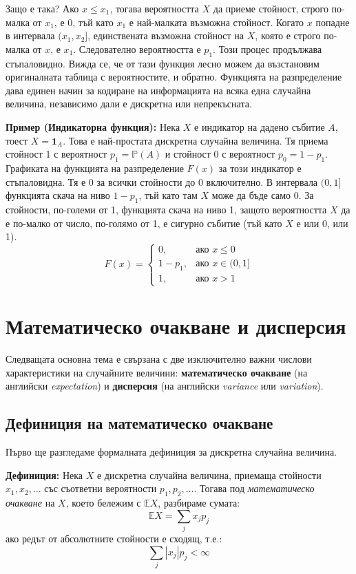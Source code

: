 \documentclass{article}
\begin{document}
Защо е така? Ако $x \le x_1$, тогава вероятността $X$ да приеме стойност, строго по-малка от $x_1$, е 0, тъй като $x_1$ е най-малката възможна стойност. Когато $x$ попадне в интервала $(x_1, x_2]$, единствената възможна стойност на $X$, която е строго по-малка от $x$, е $x_1$. Следователно вероятността е $p_1$. Този процес продължава стъпаловидно. Вижда се, че от тази функция лесно можем да възстановим оригиналната таблица с вероятностите, и обратно. Функцията на разпределение дава единен начин за кодиране на информацията на всяка една случайна величина, независимо дали е дискретна или непрекъсната.

\textbf{Пример (Индикаторна функция):}
Нека $X$ е индикатор на дадено събитие $A$, тоест $X = \mathbf{1}_A$. Това е най-простата дискретна случайна величина. Тя приема стойност 1 с вероятност $p_1 = \mathbb{P}(A)$ и стойност 0 с вероятност $p_0 = 1 - p_1$.
Графиката на функцията на разпределение $F(x)$ за този индикатор е стъпаловидна. Тя е 0 за всички стойности до 0 включително. В интервала $(0, 1]$ функцията скача на ниво $1 - p_1$, тъй като там $X$ може да бъде само 0. За стойности, по-големи от 1, функцията скача на ниво 1, защото вероятността $X$ да е по-малко от число, по-голямо от 1, е сигурно събитие (тъй като $X$ е или 0, или 1).
\[
F(x) =
\begin{cases}
0, & \text{ако } x \le 0 \\
1 - p_1, & \text{ако } x \in (0, 1] \\
1, & \text{ако } x > 1
\end{cases}
\]

\section{Математическо очакване и дисперсия}

Следващата основна тема е свързана с две изключително важни числови характеристики на случайните величини: \textbf{математическо очакване} (на английски \textit{expectation}) и \textbf{дисперсия} (на английски \textit{variance} или \textit{variation}). 

\subsection{Дефиниция на математическо очакване}

Първо ще разгледаме формалната дефиниция за дискретна случайна величина.

\textbf{Дефиниция:} Нека $X$ е дискретна случайна величина, приемаща стойности $x_1, x_2, \dots$ със съответни вероятности $p_1, p_2, \dots$. Тогава под \textit{математическо очакване} на $X$, което бележим с $\mathbb{E}X$, разбираме сумата:
\[ \mathbb{E}X = \sum_{j} x_j p_j \]
ако редът от абсолютните стойности е сходящ, т.е.:
\[ \sum_{j} |x_j| p_j < \infty \]
\end{document}
